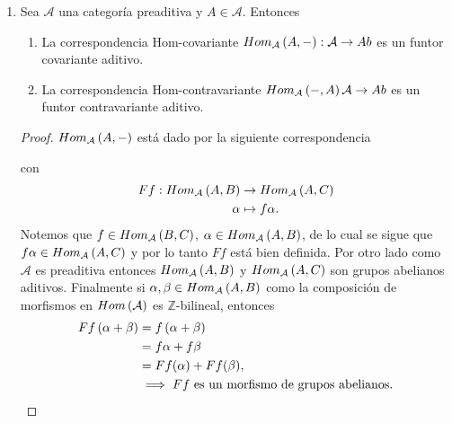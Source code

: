 \documentclass{article}
\begin{document}
\begin{enumerate}[label=\textbf{Ej \arabic*.}]
\begin{proof}
			Por definición de funtor contravariate para cada $f,g\in End_ \mathcal{A}(A)$ se tiene que 
			\[F(f\circ g)=F(g)\circ F(f)\quad \text{y}\quad F(1_A)=1_{F(A)}\quad \forall A\in Obj(\mathcal{A}).
			\]
			Entonces $F$ es morfismo de anillos entre $End_\mathcal{A}(A)$ y $End_\mathcal{B}(F(A))^{op}$, y como $F$ es fiel y pleno, la correspondencia debe ser
			biyectiva, es decir, $F$ es un isomorfismo de anillos.
		\end{proof}
		\item Sea $\mathcal{A}$ una categoría preaditiva y $A\in\mathcal{A}$. Entonces
		\begin{enumerate}
			\item La correspondencia Hom-covariante $Hom_\mathcal{A}\left(A,-\right):\mathcal{A}\to Ab$ es un funtor covariante aditivo.
			\item La correspondencia Hom-contravariante $Hom_\mathcal{A}\left(-,A\right)\mathcal{A}\to Ab$ es un funtor contravariante aditivo.
		\end{enumerate}
		\begin{proof}
			 $Hom_\mathcal{A}\left(A,-\right)$ está dado por la siguiente correspondencia
			\begin{center}
			\end{center}
			con 
			\begin{align*}
				Ff: Hom_{\mathcal{A}}\left(A,B\right) &\rightarrow Hom_{\mathcal{A}}\left(A,C\right)\\ \alpha &\mapsto f\alpha.
			\end{align*}
			Notemos que $f\in Hom_{\mathcal{A}}\left(B,C\right)$, $\alpha\in Hom_{\mathcal{A}}\left(A,B\right)$, de lo cual se sigue que $f\alpha\in Hom_{\mathcal{A}}\left(A,C\right)$ y por lo tanto $Ff$ está bien definida. Por otro lado como $\mathcal{A}$ es preaditiva entonces $Hom_{\mathcal{A}}\left(A,B\right)$ y $Hom_{\mathcal{A}}\left(A,C\right)$ son grupos abelianos aditivos. Finalmente si $\alpha,\beta\in Hom_{\mathcal{A}}\left(A,B\right)$ como la composición de morfismos en $Hom\left(\mathcal{A}\right)$ es $\mathbb{Z}$-bilineal, entonces
			\begin{align*}
				Ff\left(\alpha+\beta\right)&=f\left(\alpha+\beta\right)\\
				&=f\alpha+f\beta\\
				&=Ff(\alpha)+Ff(\beta),\\
				&\implies Ff\text{ es un morfismo de grupos abelianos}.
			\end{align*}

\end{proof}
\end{enumerate}
\end{document}
